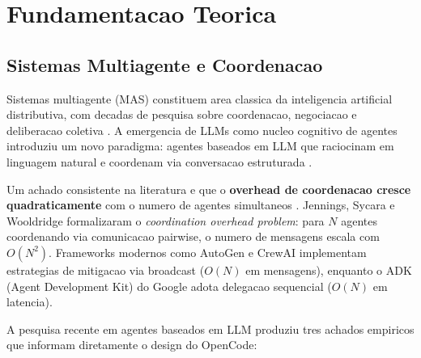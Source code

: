 \documentclass[5p]{elsarticle}
\begin{document}
\section{Fundamentacao Teorica}

\subsection{Sistemas Multiagente e Coordenacao}

Sistemas multiagente (MAS) constituem area classica da inteligencia artificial distributiva, com decadas de pesquisa sobre coordenacao, negociacao e deliberacao coletiva \cite{jennings1998,wooldridge2009}. A emergencia de LLMs como nucleo cognitivo de agentes introduziu um novo paradigma: agentes baseados em LLM que raciocinam em linguagem natural e coordenam via conversacao estruturada \cite{wu2023,park2023}.

Um achado consistente na literatura e que o \textbf{overhead de coordenacao cresce quadraticamente} com o numero de agentes simultaneos \cite{durfee1989,shen2000}. Jennings, Sycara e Wooldridge \cite{jennings1998} formalizaram o \textit{coordination overhead problem}: para $N$ agentes coordenando via comunicacao pairwise, o numero de mensagens escala com $O(N^2)$. Frameworks modernos como AutoGen \cite{wu2023} e CrewAI implementam estrategias de mitigacao via broadcast ($O(N)$ em mensagens), enquanto o ADK (Agent Development Kit) do Google adota delegacao sequencial ($O(N)$ em latencia).

A pesquisa recente em agentes baseados em LLM produziu tres achados empiricos que informam diretamente o design do OpenCode:
\end{document}

